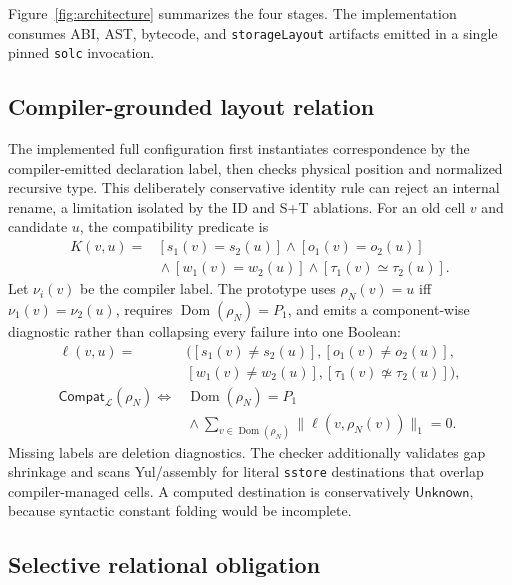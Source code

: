 \documentclass[runningheads]{llncs}
\newcommand{\Unknown}{\mathsf{Unknown}}
\begin{document}
Figure~\ref{fig:architecture} summarizes the four stages.  The implementation consumes ABI, AST, bytecode, and \texttt{storageLayout} artifacts emitted in a single pinned \texttt{solc} invocation.

\subsection{Compiler-grounded layout relation}

The implemented full configuration first instantiates correspondence by the compiler-emitted declaration label, then checks physical position and normalized recursive type.  This deliberately conservative identity rule can reject an internal rename, a limitation isolated by the ID and S+T ablations.  For an old cell \(v\) and candidate \(u\), the compatibility predicate is
\begin{equation}
\begin{aligned}
K(v,u)={}&[s_1(v)=s_2(u)]\land[o_1(v)=o_2(u)]\\
&{}\land[w_1(v)=w_2(u)]\land[\tau_1(v)\simeq\tau_2(u)].
\end{aligned}
\label{eq:cell-compatibility}
\end{equation}
Let \(\nu_i(v)\) be the compiler label.  The prototype uses \(\rho_N(v)=u\) iff \(\nu_1(v)=\nu_2(u)\), requires \(\operatorname{Dom}(\rho_N)=P_1\), and emits a component-wise diagnostic rather than collapsing every failure into one Boolean:
\begin{equation}
\begin{aligned}
\boldsymbol{\ell}(v,u)
={}&\bigl([s_1(v)\neq s_2(u)],[o_1(v)\neq o_2(u)],\\
&[w_1(v)\neq w_2(u)],[\tau_1(v)\not\simeq\tau_2(u)]\bigr),\\
\mathsf{Compat}_{\mathcal L}(\rho_N)
\Longleftrightarrow{}&
\operatorname{Dom}(\rho_N)=P_1\\
&{}\land
\sum_{v\in\operatorname{Dom}(\rho_N)}
\|\boldsymbol{\ell}(v,\rho_N(v))\|_1=0.
\end{aligned}
\label{eq:layout-diagnostic}
\end{equation}
Missing labels are deletion diagnostics.  The checker additionally validates gap shrinkage and scans Yul/assembly for literal \texttt{sstore} destinations that overlap compiler-managed cells.  A computed destination is conservatively \(\Unknown\), because syntactic constant folding would be incomplete.

\subsection{Selective relational obligation}
\end{document}
